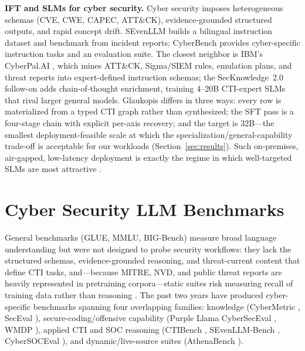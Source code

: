 \documentclass[conference]{IEEEtran}
\begin{document}
\textbf{IFT and SLMs for cyber security.} Cyber security imposes heterogeneous schemas (CVE, CWE, CAPEC, ATT\&CK), evidence-grounded structured outputs, and rapid concept drift. SEvenLLM \cite{ji2024sevenllm} builds a bilingual instruction dataset and benchmark from incident reports; CyberBench \cite{liu2024cyberbench} provides cyber-specific instruction tasks and an evaluation suite. The closest neighbor is IBM's CyberPal.AI \cite{levi2024cyberpal}, which mines ATT\&CK, Sigma/SIEM rules, emulation plans, and threat reports into expert-defined instruction schemas; the SecKnowledge~2.0 follow-on \cite{levi2025toward} adds chain-of-thought enrichment, training 4--20B CTI-expert SLMs that rival larger general models. Glaukopis differs in three ways: every row is materialized from a typed CTI graph rather than synthesized; the SFT pass is a four-stage chain with explicit per-axis recovery; and the target is 32B---the smallest deployment-feasible scale at which the specialization/general-capability trade-off is acceptable for our workloads (Section~\ref{sec:results}). Such on-premises, air-gapped, low-latency deployment is exactly the regime in which well-targeted SLMs are most attractive \cite{levi2025toward}.

\section{Cyber Security LLM Benchmarks}
\label{sec:benchmarks}

General benchmarks (GLUE, MMLU, BIG-Bench) measure broad language understanding but were not designed to probe security workflows: they lack the structured schemas, evidence-grounded reasoning, and threat-current content that define CTI tasks, and---because MITRE, NVD, and public threat reports are heavily represented in pretraining corpora---static suites risk measuring recall of training data rather than reasoning \cite{alam2025athenabench}. The past two years have produced cyber-specific benchmarks spanning four overlapping families: knowledge (CyberMetric \cite{tihanyi2024cybermetric}, SecEval \cite{hu2024seceval}), secure-coding/offensive capability (Purple Llama CyberSecEval \cite{bhatt2023purplellama,bhatt2024cyberseceval2}, WMDP \cite{li2024wmdp}), applied CTI and SOC reasoning (CTIBench \cite{alam2024ctibench}, SEvenLLM-Bench \cite{ji2024sevenllm}, CyberSOCEval \cite{cybersoceval2025}), and dynamic/live-source suites (AthenaBench \cite{alam2025athenabench}).
\end{document}
